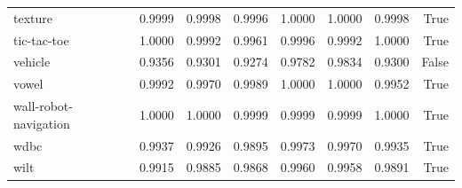 \begin{table}[htbp]
\begin{tabular}{lrrrrrrr}
texture & 0.9999 & 0.9998 & 0.9996 & 1.0000 & 1.0000 & 0.9998 & True \\
tic-tac-toe & 1.0000 & 0.9992 & 0.9961 & 0.9996 & 0.9992 & 1.0000 & True \\
vehicle & 0.9356 & 0.9301 & 0.9274 & 0.9782 & 0.9834 & 0.9300 & False \\
vowel & 0.9992 & 0.9970 & 0.9989 & 1.0000 & 1.0000 & 0.9952 & True \\
wall-robot-navigation & 1.0000 & 1.0000 & 0.9999 & 0.9999 & 0.9999 & 1.0000 & True \\
wdbc & 0.9937 & 0.9926 & 0.9895 & 0.9973 & 0.9970 & 0.9935 & True \\
wilt & 0.9915 & 0.9885 & 0.9868 & 0.9960 & 0.9958 & 0.9891 & True \\
\hline
\end{tabular}
\end{table}
